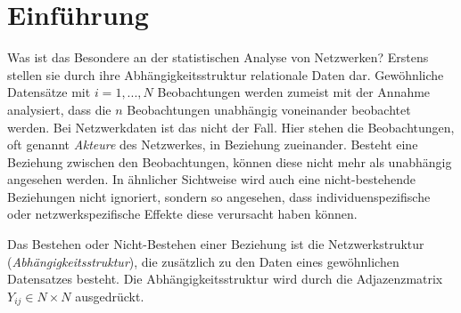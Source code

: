 \documentclass[a4paper,ngerman,oneside,titlepage,bibliography=totoc,11pt]{scrreprt}
\begin{document}
\begin{abstract}


\begin{center}
{\it \bf Abstract} 
\end{center}
Dieser Bericht behandelt die Analyse der \emph{NISAT database of transfers of small arms, light weapons, and their ammunition, parts and accessories}. Die Netzwerkdaten stellen das internationale Kleinwaffenhandelsnetzwerk im Zeitraum 1992 bis 2011 dar.

Nachdem die Datengrundlage besprochen wird, erfolgt eine deskriptive Analyse des Handelsnetzwerkes anhand Zeitreihen von Netzwerkstatistiken. Im zweiten Teil wird der Querschnitt des Netzwerkes Jahr für Jahr anhand von ERGMs modelliert, um charakteristische Strukturen des Netzwerkes aufzudecken. Der Fokus liegt hierbei auf der Selektion interner Netzwerkstatistiken sowie externer Kovariablen.
 \\
 
 {\bf Schlagwörter}

\end{abstract}




\tableofcontents




\chapter{Einführung}

Was ist das Besondere an der statistischen Analyse von Netzwerken? Erstens stellen sie durch ihre Abhängigkeitsstruktur relationale Daten dar. Gewöhnliche Datensätze mit $i = 1, ..., N$ Beobachtungen werden zumeist mit der Annahme analysiert, dass die $n$ Beobachtungen unabhängig voneinander beobachtet werden. Bei Netzwerkdaten ist das nicht der Fall. Hier stehen die Beobachtungen, oft genannt \emph{Akteure} des Netzwerkes, in Beziehung zueinander. Besteht eine Beziehung zwischen den Beobachtungen, können diese nicht mehr als unabhängig angesehen werden. In ähnlicher Sichtweise wird auch eine nicht-bestehende Beziehungen nicht ignoriert, sondern so angesehen, dass individuenspezifische oder netzwerkspezifische Effekte diese verursacht haben können.

Das Bestehen oder Nicht-Bestehen einer Beziehung ist die Netzwerkstruktur (\emph{Abhängigkeitsstruktur}), die zusätzlich zu den Daten eines gewöhnlichen Datensatzes besteht. Die Abhängigkeitsstruktur wird durch die Adjazenzmatrix $Y_{ij} \in N \times N$ ausgedrückt.
\end{document}
